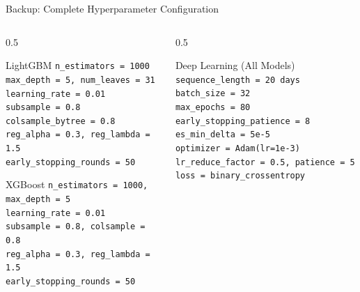 \documentclass[aspectratio=43,11pt]{beamer}
\begin{document}
\begin{frame}{Backup: Complete Hyperparameter Configuration}
    \begin{columns}[T]
        \begin{column}{0.5\textwidth}
            \begin{block}{LightGBM}
                \footnotesize
                \texttt{n\_estimators = 1000}\\
                \texttt{max\_depth = 5, num\_leaves = 31}\\
                \texttt{learning\_rate = 0.01}\\
                \texttt{subsample = 0.8}\\
                \texttt{colsample\_bytree = 0.8}\\
                \texttt{reg\_alpha = 0.3, reg\_lambda = 1.5}\\
                \texttt{early\_stopping\_rounds = 50}
            \end{block}
            \begin{block}{XGBoost}
                \footnotesize
                \texttt{n\_estimators = 1000, max\_depth = 5}\\
                \texttt{learning\_rate = 0.01}\\
                \texttt{subsample = 0.8, colsample = 0.8}\\
                \texttt{reg\_alpha = 0.3, reg\_lambda = 1.5}\\
                \texttt{early\_stopping\_rounds = 50}
            \end{block}
        \end{column}
        \begin{column}{0.5\textwidth}
            \begin{block}{Deep Learning (All Models)}
                \footnotesize
                \texttt{sequence\_length = 20 days}\\
                \texttt{batch\_size = 32}\\
                \texttt{max\_epochs = 80}\\
                \texttt{early\_stopping\_patience = 8}\\
                \texttt{es\_min\_delta = 5e-5}\\
                \texttt{optimizer = Adam(lr=1e-3)}\\
                \texttt{lr\_reduce\_factor = 0.5, patience = 5}\\
                \texttt{loss = binary\_crossentropy}\\

\end{block}
\end{column}
\end{columns}
\end{frame}
\end{document}
